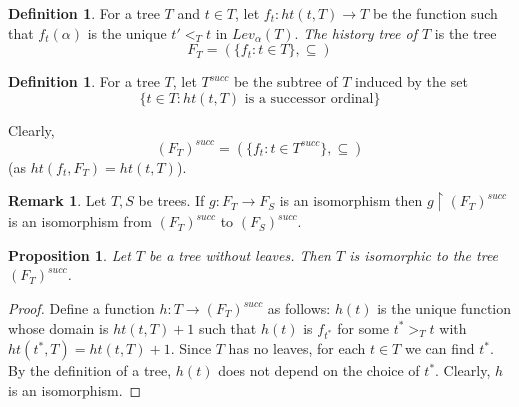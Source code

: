 \documentclass[11pt]{amsart}
\theoremstyle{plain}
\newtheorem{proposition}[theorem]{Proposition}
\theoremstyle{definition} %
\newtheorem{definition}[theorem]{Definition}
\newtheorem{remark}[theorem]{Remark}
\theoremstyle{remark}
\begin{document}

\begin{definition}
For a tree $T$ and $t \in T$, let $f_t:ht(t,T) \to T$ be the function such that $f_t(\alpha)$ is the unique $t'<_Tt$ in $Lev_\alpha(T)$. \emph{The history tree of $T$} is the tree
\[
F_T=(\{f_t:t \in T\},\subseteq)
\]
\end{definition}

\begin{definition}
For a tree $T$, let
$T^{succ}$ be the subtree of $T$ induced by the set
\[
\{t \in T:ht(t,T) \text{ is a successor ordinal}\}
\]
\end{definition}
Clearly,
\[
(F_T)^{succ}=(\{f_t:t \in T^{succ}\},\subseteq)
\]
(as $ht(f_t,F_T)=ht(t,T)$).



\begin{remark}\label{remark 3.3}
Let $T,S$ be trees. If $g:F_T \to F_S$ is an isomorphism then
$g \restriction (F_T)^{succ}$ is an isomorphism from $(F_T)^{succ}$ to $(F_S)^{succ}$.
\end{remark}

\begin{proposition}\label{proposition without leaves}
Let $T$ be a tree without leaves. Then $T$ is isomorphic to the tree $(F_T)^{succ}$.
\end{proposition}

\begin{proof}
Define a function $h:T \to (F_T)^{succ}$ as follows:
$h(t)$ is the unique function whose domain is $ht(t,T)+1$ such that $h(t)$ is $f_{t^*}$ for some $t^*>_T t$ with $ht(t^*,T)=ht(t,T)+1$. Since $T$ has no leaves, for each $t \in T$ we can find $t^*$. By the definition of a tree, $h(t)$ does not depend on the choice of $t^*$. Clearly, $h$ is an isomorphism.
\end{proof}
\end{document}

